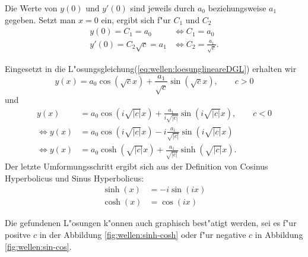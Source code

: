 Die Werte von $y(0)$ und $y'(0)$ sind jeweils durch $a_0$ beziehungsweise $a_1$ 
gegeben. Setzt man $x = 0$ ein, ergibt sich f"ur $C_1$ und $C_2$
\begin{equation}
	\begin{split}
		y(0) = C_1 = a_0 &\Leftrightarrow C_1 = a_0 \\
		y'(0) = C_2 \sqrt{c} = a_1 &\Leftrightarrow C_2 = \frac{a_1}{\sqrt{c}}.
	\end{split}
\end{equation}

Eingesetzt in die L"osungsgleichung(\ref{eq:wellen:loesunglineareDGL}) erhalten 
wir
\begin{equation*}
	y(x) = a_0 \cos(\sqrt{c}x) + \frac{a_1}{\sqrt{c}} \sin(\sqrt{c}x), \qquad c 
	> 0
\end{equation*}
und
\begin{equation}
	\begin{split}
		y(x) &= a_0 \cos(i\sqrt{|c|}x) + 
		\frac{a_1}{i\sqrt{|c|}}\sin(i\sqrt{|c|}x), \qquad c < 0\\
		\Leftrightarrow
		y(x) &= a_0 \cos(i\sqrt{|c|}x) - 
		i\frac{a_1}{\sqrt{|c|}}\sin(i\sqrt{|c|}x)\\
		\Leftrightarrow
		y(x) &= a_0 \cosh(\sqrt{|c|}x) + 
		\frac{a_1}{\sqrt{|c|}}\sinh(\sqrt{|c|}x).
	\end{split}	
\end{equation}
Der letzte Umformungsschritt ergibt sich aus der Definition von Cosinus 
Hyperbolicus und Sinus Hyperbolicus:
\begin{equation*}
	\begin{split}
		\sinh(x) &= -i \sin(ix)\\
		\cosh(x) &= \cos (ix)
	\end{split}
\end{equation*}

Die gefundenen L"osungen k"onnen auch graphisch best"atigt werden, sei es f"ur 
positve $c$ in der Abbildung \ref{fig:wellen:sinh-cosh} oder f"ur negative $c$ 
in Abbildung \ref{fig:wellen:sin-cos}.

